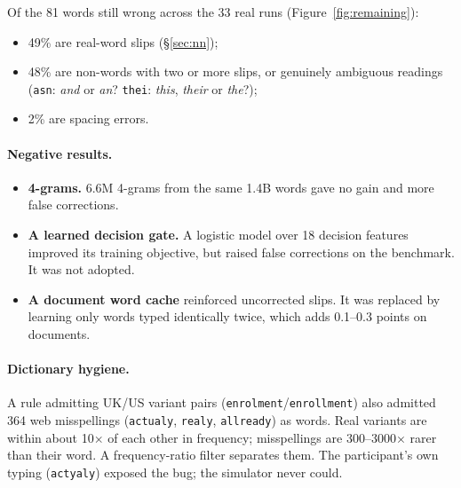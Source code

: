 \documentclass[11pt,a4paper]{article}
\newcommand{\ttw}[1]{\texttt{#1}}
\begin{document}
Of the 81 words still wrong across the 33 real runs (Figure~\ref{fig:remaining}):
\begin{itemize}
\item 49\% are real-word slips (\S\ref{sec:nn});
\item 48\% are non-words with two or more slips, or genuinely ambiguous readings (\ttw{asn}: \emph{and} or \emph{an}? \ttw{thei}: \emph{this}, \emph{their} or \emph{the}?);
\item 2\% are spacing errors.
\end{itemize}

\paragraph{Negative results.}
\begin{itemize}
\item \textbf{4-grams.} 6.6M 4-grams from the same 1.4B words gave no gain and more false corrections.
\item \textbf{A learned decision gate.} A logistic model over 18 decision features improved its training objective, but raised false corrections on the benchmark. It was not adopted.
\item \textbf{A document word cache} reinforced uncorrected slips. It was replaced by learning only words typed identically twice, which adds 0.1--0.3 points on documents.
\end{itemize}

\paragraph{Dictionary hygiene.} A rule admitting UK/US variant pairs (\ttw{enrolment}/\ttw{enrollment}) also admitted 364 web misspellings (\ttw{actualy}, \ttw{realy}, \ttw{allready}) as words. Real variants are within about 10$\times$ of each other in frequency; misspellings are 300--3000$\times$ rarer than their word. A frequency-ratio filter separates them. The participant's own typing (\ttw{actyaly}) exposed the bug; the simulator never could.

\end{document}
